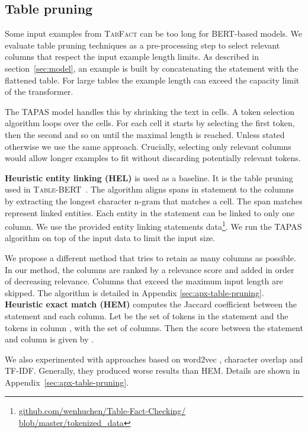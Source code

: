 \documentclass[11pt,a4paper]{article}
\newcommand{\tabfact}{\textsc{TabFact}\xspace}
\newcommand{\tapas}{\textsc{TAPAS}\xspace}
\newcommand{\bert}{\textsc{BERT}\xspace}
\newcommand{\tablebert}{\textsc{Table-BERT}\xspace}
\theoremstyle{definition}
\begin{document}
\subsection{Table pruning}
\label{sec:pruning}
Some input examples from \tabfact{} can be too long for \bert-based models. We evaluate table pruning techniques as a pre-processing step to select relevant columns that respect the input example length limits.
As described in section~\ref{sec:model}, an example is built by concatenating the statement with the flattened table. 
For large tables the example length can exceed the capacity limit of the transformer.

The \tapas{} model handles this by shrinking the text in cells. A token selection algorithm loops over the cells. For each cell it starts by selecting the first token, then the second and so on until the maximal length is reached. 
Unless stated otherwise we use the same approach.
Crucially, selecting only relevant columns would allow longer examples to fit without discarding potentially relevant tokens.

\textbf{Heuristic entity linking (HEL)} is used as a baseline. It is the table pruning used in \tablebert{}~\cite{2019TabFactA}. 
The algorithm aligns spans in statement to the columns
by extracting the longest character n-gram that matches a cell. The span matches represent linked entities. 
Each entity in the statement can be linked to only one column.
We use the provided entity linking statements data\footnote{\href{https://github.com/wenhuchen/Table-Fact-Checking/blob/master/tokenized_data}{github.com/wenhuchen/Table-Fact-Checking/\\blob/master/tokenized\_data}}.
We run the \tapas{} algorithm on top of the input data to limit the input size.

We propose a different method that tries to retain as many columns as possible.
In our method, the columns are ranked by a relevance score and added in order of decreasing relevance.
Columns that exceed the maximum input length are skipped.
The algorithm is detailed in Appendix \ref{sec:apx-table-pruning}.
\textbf{Heuristic exact match (HEM)} computes the Jaccard coefficient between the statement and each column.
Let  be the set of tokens in the statement  and  the tokens in column , with  the set of columns. Then the score between the statement and column is given by .

We also experimented with approaches based on word2vec \cite{mikolov-13}, character overlap and TF-IDF.
Generally, they produced worse results than HEM.
Details are shown in Appendix~\ref{sec:apx-table-pruning}.
\end{document}
